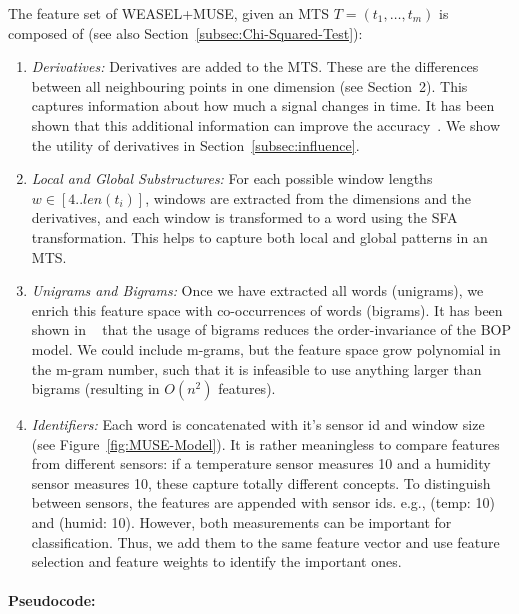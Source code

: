 \documentclass[sigconf]{acmart}
\begin{document}
The feature set of WEASEL+MUSE, given an MTS $T=(t_1,\dots,t_m)$ is composed of (see also Section~\ref{subsec:Chi-Squared-Test}):
\begin{enumerate}
	\item \emph{Derivatives:} Derivatives are added to the MTS. These are the differences between all neighbouring points in one dimension (see Section~2). This captures information about how much a signal changes in time. It has been shown that this additional information can improve the accuracy~\cite{baydogan2015learning}. We show the utility of derivatives in Section~\ref{subsec:influence}.
			
	\item \emph{Local and Global Substructures:} For each possible window lengths $w \in [4..len(t_i)]$, windows are extracted from the dimensions and the derivatives, and each window is transformed to a word using the SFA transformation. This helps to capture both local and global patterns in an MTS. 
	
	\item \emph{Unigrams and Bigrams:} Once we have extracted all words (unigrams), we enrich this feature space with co-occurrences of words (bigrams). It has been shown in ~\cite{schaefer2017weasel} that the usage of bigrams reduces the order-invariance of the BOP model. We could include m-grams, but the feature space grow polynomial in the m-gram number, such that it is infeasible to use anything larger than bigrams (resulting in $O(n^2)$ features).
	
	\item \emph{Identifiers:} Each word is concatenated with it's sensor id and window size (see Figure~\ref{fig:MUSE-Model}). It is rather meaningless to compare features from different sensors: if a temperature sensor measures 10 and a humidity sensor measures 10, these capture totally different concepts. To distinguish between sensors, the features are appended with sensor ids. e.g., (temp: 10) and (humid: 10). However, both measurements can be important for classification. Thus, we add them to the same feature vector and use feature selection and feature weights to identify the important ones.
\end{enumerate} 


\paragraph{Pseudocode:}
\end{document}
